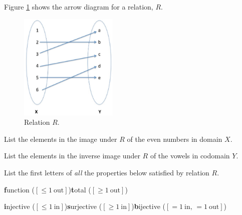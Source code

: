 \documentclass[handout]{mcs}
\begin{document}


\begin{problem}
Figure \ref{fig:img} shows the arrow diagram for a relation, $R$.

\begin{figure}[h]

\includegraphics[height = 2in ]{image-inverseimage2}

\caption{Relation $R$.}
\label{fig:img}
\end{figure}
\bparts

\ppart List the elements in the image under $R$ of the even numbers in domain $X$.\hfill\brule{1.5in}

\ppart List the elements in the inverse image under $R$ of the vowels in codomain $Y$.\hfill\brule{1.5in}

\ppart List the first letters of \emph{all} the properties below
satisfied by relation $R$.\hfill\brule{1.0in}
\begin{center}
 \textbf{f}unction ($[\le 1\ \text{out}]$)\qquad \textbf{t}otal ($[\ge
   1\ \text{out}]$)

 \textbf{i}njective ($[\le 1\ \text{in}]$)\qquad \textbf{s}urjective
 ($[\ge 1\ \text{in}]$)\qquad \textbf{b}ijective ($[= 1\ \text{in, } =
   1\ \text{out}]$)
\end{center}

\eparts
\end{problem}

\begin{problem}
\end{problem}

\end{document}
